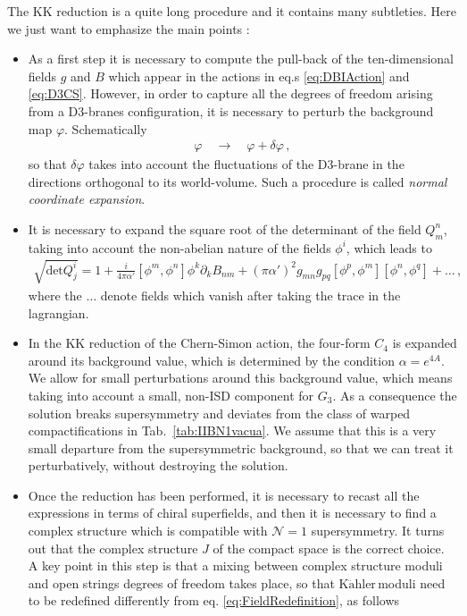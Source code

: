 \documentclass[12pt,a4paper]{book}
\newcommand{\Kahler}{\ensuremath{\text{K}\ddot{\text{a}}\text{hler}\,}}
\begin{document}
The KK reduction is a quite long procedure and it contains many subtleties. Here we just want to emphasize the main points \cite{Grana:2003ek}:
\begin{itemize}
\item As a first step it is necessary to compute the pull-back of the ten-dimensional fields $g$ and $B$ which appear in the actions in eq.s \eqref{eq:DBIAction} and \eqref{eq:D3CS}. However, in order to capture all the degrees of freedom arising from a D3-branes configuration, it is necessary to perturb the background map $\varphi$. Schematically
\begin{align}
\label{eq:PerturbedEmbeddingMap}
\varphi \quad \rightarrow \quad \varphi + \delta \varphi \,,
\end{align}
so that $\delta \varphi$ takes into account the fluctuations of the D3-brane in the directions orthogonal to its world-volume. Such a procedure is called \textit{normal coordinate expansion}.
\item It is necessary to expand the square root of the determinant of the field $Q^n_m$, taking into account the non-abelian nature of the fields $\phi^i$, which leads to
\begin{align}
\sqrt{\text{det} Q^i_j} = 1 + \frac{i}{4 \pi \alpha'} \left[\phi^m, \phi^n\right] \phi^k \partial_k B_{nm} + \left(\pi \alpha'\right)^2 g_{mn} g_{pq} \left[\phi^p, \phi^m\right] \left[\phi^n, \phi^q\right] + \dots\,, \nonumber
\end{align}
where the $\dots$ denote fields which vanish after taking the trace in the lagrangian.
\item In the KK reduction of the Chern-Simon action, the four-form $C_4$ is expanded around its background value, which is determined by the condition $\alpha = e^{4 A}$. We allow for small perturbations around this background value, which means taking into account a small, non-ISD component for $G_3$. As a consequence the solution breaks supersymmetry and deviates from the class of warped compactifications in Tab.~\ref{tab:IIBN1vacua}. We assume that this is a very small departure from the supersymmetric background, so that we can treat it perturbatively, without destroying the solution.
\item Once the reduction has been performed, it is necessary to recast all the expressions in terms of chiral superfields, and then it is necessary to find a complex structure which is compatible with $\mathcal{N} = 1$ supersymmetry. It turns out that the complex structure $J$ of the compact space is the correct choice. A key point in this step is that a mixing between complex structure moduli and open strings degrees of freedom takes place, so that \Kahler moduli need to be redefined differently from eq. \eqref{eq:FieldRedefinition}, as follows~\cite{Grana:2003ek}

\end{itemize}
\end{document}
